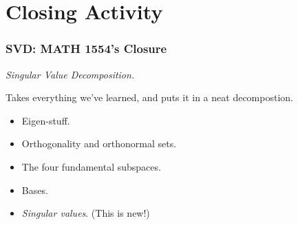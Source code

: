 \documentclass{beamer}
\begin{document}
	\section{Closing Activity}
	\begin{frame}
	\frametitle{SVD: MATH 1554's Closure}
		\centering \textit{Singular Value Decomposition.} \pause

		Takes everything we've learned, and puts it in a neat decompostion.
		\begin{itemize}[<+(1)->]
			\item Eigen-stuff.
			\item Orthogonality and orthonormal sets.
			\item The four fundamental subspaces.
			\item Bases.
			\item \textit{Singular values}. (This is new!)
		\end{itemize}
	\end{frame}
\end{document}
